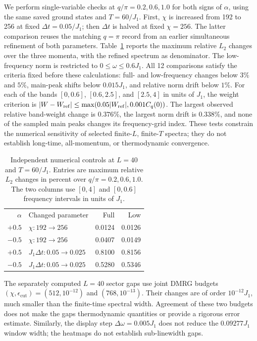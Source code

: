 We perform single-variable checks at
$q/\pi=0.2,0.6,1.0$ for both signs of $\alpha$, using the same saved ground
states and $T=60/J_1$.
First, $\chi$ is increased from 192 to 256 at fixed $\Delta t=0.05/J_1$;
then $\Delta t$ is halved at fixed $\chi=256$.
The latter comparison reuses the matching $q=\pi$ record from an earlier
simultaneous refinement of both parameters.
Table~\ref{tab:independent-controls} reports the maximum relative
$L_2$ changes over the three momenta, with the refined spectrum as denominator.
The low-frequency norm is restricted to $0\le\omega\le0.6J_1$.
All 12 comparisons satisfy the criteria fixed before these calculations:
full- and low-frequency changes below $3\%$ and $5\%$, main-peak shifts
below $0.015J_1$, and relative norm drift below $1\%$.
For each of the bands $[0,0.6]$, $[0.6,2.5]$, and $[2.5,4]$ in units of
$J_1$, the weight criterion is
$|W-W_{\rm ref}|\le\max(0.05|W_{\rm ref}|,0.001C_q(0))$.
The largest observed relative band-weight change is $0.376\%$, the largest
norm drift is $0.338\%$, and none of the sampled main peaks changes its
frequency-grid index. These tests constrain the numerical sensitivity of
selected finite-$L$, finite-$T$ spectra; they do not establish long-time,
all-momentum, or thermodynamic convergence.

\begin{table}[!htbp]
 \caption{Independent numerical controls at $L=40$ and $T=60/J_1$.
 Entries are maximum relative $L_2$ changes in percent over
 $q/\pi=0.2,0.6,1.0$. The two columns use $[0,4]$ and $[0,0.6]$ frequency
 intervals in units of $J_1$.}
 \label{tab:independent-controls}
 \begin{ruledtabular}
 \begin{tabular}{rlrr}
 $\alpha$ & Changed parameter & Full & Low\\
 $+0.5$ & $\chi:192\to256$ & 0.0124 & 0.0126\\
 $-0.5$ & $\chi:192\to256$ & 0.0407 & 0.0149\\
 $+0.5$ & $J_1\Delta t:0.05\to0.025$ & 0.8100 & 0.8156\\
 $-0.5$ & $J_1\Delta t:0.05\to0.025$ & 0.5280 & 0.5346\\
 \end{tabular}
 \end{ruledtabular}
\end{table}

The separately computed $L=40$ sector gaps use joint DMRG budgets
$(\chi,\epsilon_{\mathrm{cut}})=(512,10^{-12})$ and $(768,10^{-13})$.
Their changes are of order $10^{-12}J_1$, much smaller than the finite-time
spectral width. Agreement of these two budgets does not make the gaps
thermodynamic quantities or provide a rigorous error estimate.
Similarly, the display step $\Delta\omega=0.005J_1$ does not reduce the
$0.09277J_1$ window width; the heatmaps do not establish sub-linewidth gaps.

